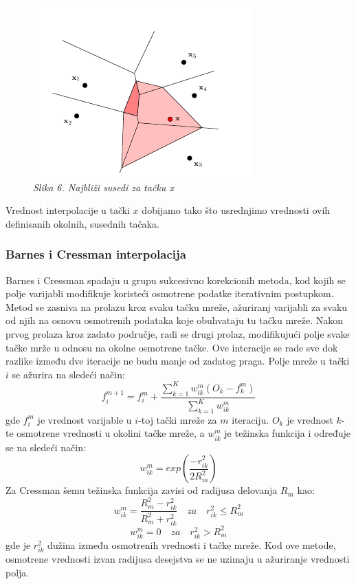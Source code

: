 \documentclass[12pt]{article}
\begin{document}
\begin{figure}[h!]
\centering
\includegraphics[width=0.6\linewidth]{slika6.png}
\caption*{\textsl{Slika 6. Najbliži susedi za tačku x}}
\end{figure}
Vrednost interpolacije u tački $x$ dobijamo tako što usrednjimo vrednosti ovih definisanih okolnih, susednih tačaka. 


 
\subsubsection{Barnes i Cressman interpolacija}
Barnes i Cressman spadaju u grupu sukcesivno korekcionih metoda, kod kojih se polje varijabli modifikuje koristeći osmotrene podatke iterativnim postupkom. Metod se zasniva na prolazu kroz svaku tačku mreže, ažuriranj varijabli za svaku od njih na osnovu osmotrenih podataka koje obuhvataju tu tačku mreže. Nakon prvog prolaza kroz zadato područje, radi se drugi prolaz, modifikujući polje svake tačke mrže u odnosu na okolne osmotrene tačke. Ove interacije se rade sve dok razlike između dve iteracije ne budu manje od zadatog praga.  
Polje mreže u tački $i$ se ažurira na sledeći način:
\begin{equation}
f_{i}^{m+1}=f_{i}^{m}+\frac{\sum_{k=1}^{K}w_{ik}^{m}(O_{k}-f_{k}^{m})}{\sum_{k=1}^{K}w_{ik}^{m}}
\end{equation}
gde $f_{i}^m$ je vrednost varijable u $i$-toj tački mreže za $m$ iteraciju. $O_k$ je vrednost $k$-te osmotrene vrednosti u okolini tačke mreže, a $w_{ik}^m$ je težinska funkcija i određuje se na sledeći način:
\begin{equation}
w_{ik}^m = exp(\frac{-r_{ik}^{2}}{2R_{m}^2})
\end{equation}
Za Cressman šemu težinska funkcija zavisi od radijusa delovanja $R_m$ kao:
\begin{equation}\label{key}
w_{ik}^m = \frac{R_{m}^{2}-r_{ik}^2}{R_{m}^{2}+r_{ik}^2}\quad za \quad r_{ik}^{2}\leq R_{m}^2
\end{equation}
\begin{equation}\label{key}
w_{ik}^{m}=0 \quad za \quad r_{ik}^{2}> R_{m}^2
\end{equation}
gde je $r_{ik}^2$ dužina između osmotrenih vrednosti i tačke mreže. Kod ove metode, osmotrene vrednosti izvan radijusa desejstva se ne uzimaju u ažuriranje vrednosti polja. 
\end{document}
